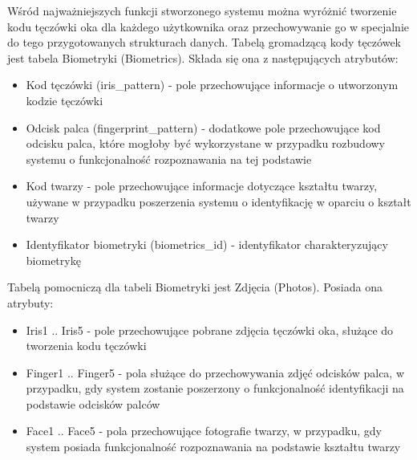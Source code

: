 Wśród najważniejszych funkcji stworzonego systemu można wyróżnić tworzenie kodu tęczówki oka dla każdego użytkownika oraz przechowywanie go w specjalnie do tego przygotowanych strukturach danych. Tabelą gromadzącą kody tęczówek jest tabela Biometryki (Biometrics). Składa się ona z następujących atrybutów:
\begin{itemize}
\item Kod tęczówki (iris\_pattern) - pole przechowujące informacje o utworzonym kodzie tęczówki 
\item Odcisk palca (fingerprint\_pattern) - dodatkowe pole przechowujące kod odcisku palca, które mogłoby być wykorzystane w przypadku rozbudowy systemu o funkcjonalność rozpoznawania na tej podstawie
\item Kod twarzy - pole przechowujące informacje dotyczące kształtu twarzy, używane w przypadku poszerzenia systemu o identyfikację w oparciu o kształt twarzy
\item Identyfikator biometryki (biometrics\_id) - identyfikator charakteryzujący biometrykę
\end{itemize}

Tabelą pomocniczą dla tabeli Biometryki jest Zdjęcia (Photos). Posiada ona atrybuty:
\begin{itemize}
\item Iris1 .. Iris5 - pole przechowujące pobrane zdjęcia tęczówki oka, służące do tworzenia kodu tęczówki
\item Finger1 .. Finger5 - pola służące do przechowywania zdjęć odcisków palca, w przypadku, gdy system zostanie poszerzony o funkcjonalność identyfikacji na podstawie odcisków palców
\item Face1 .. Face5 - pola przechowujące fotografie twarzy, w przypadku, gdy system posiada funkcjonalność rozpoznawania na podstawie kształtu twarzy
\end{itemize}

